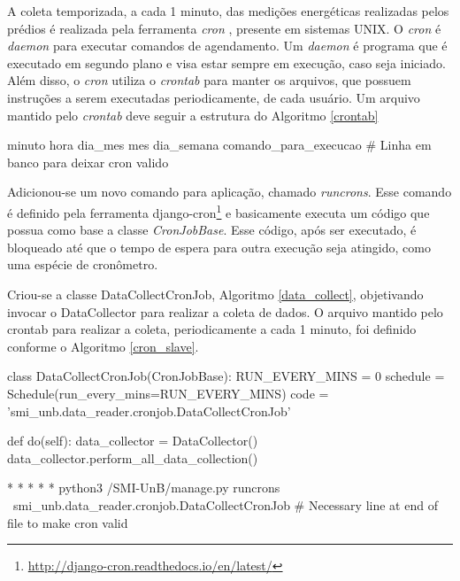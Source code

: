 A coleta temporizada, a cada 1 minuto, das medições energéticas realizadas pelos prédios é realizada pela ferramenta \textit{cron} \cite{paul_cron}, presente em sistemas UNIX. O \textit{cron} é \textit{daemon} para executar comandos de agendamento. Um \textit{daemon} é programa que é executado em segundo plano e visa estar sempre em execução, caso seja iniciado. Além disso, o \textit{cron} utiliza o \textit{crontab} para manter os arquivos, que possuem instruções a serem executadas periodicamente, de cada usuário. Um arquivo mantido pelo \textit{crontab} deve seguir a estrutura do Algoritmo \ref{crontab}

\begin{python}[caption={Estrutura de um arquivo mantido pelo \textit{crontab}.}, captionpos=b, label={crontab}]
minuto hora dia_mes mes dia_semana comando_para_execucao
# Linha em banco para deixar cron valido
\end{python}

Adicionou-se um novo comando para aplicação, chamado \textit{runcrons}. Esse comando é definido pela ferramenta django-cron\footnote{\url{http://django-cron.readthedocs.io/en/latest/}} e basicamente executa um código que possua como base a classe \textit{CronJobBase}. Esse código, após ser executado, é bloqueado até que o tempo de espera para outra execução seja atingido, como uma espécie de cronômetro.

Criou-se a classe DataCollectCronJob, Algoritmo \ref{data_collect}, objetivando invocar o DataCollector para realizar a coleta de dados. O arquivo mantido pelo crontab para realizar a coleta, periodicamente a cada 1 minuto, foi definido conforme o Algoritmo \ref{cron_slave}.

\begin{python}[caption={Classe DataCollectCronJob.}, captionpos=b, label={data_collect}]
class DataCollectCronJob(CronJobBase):
    RUN_EVERY_MINS = 0
    schedule = Schedule(run_every_mins=RUN_EVERY_MINS)
    code = 'smi_unb.data_reader.cronjob.DataCollectCronJob'

    def do(self):
        data_collector = DataCollector()
        data_collector.perform_all_data_collection()
\end{python}

\begin{python}[caption={\textit{Cron} para execução da coleta dos dados de energia.}, captionpos=b, label={cron_slave}]
* * * * * python3 /SMI-UnB/manage.py runcrons \
smi_unb.data_reader.cronjob.DataCollectCronJob
# Necessary line at end of file to make cron valid
\end{python}

